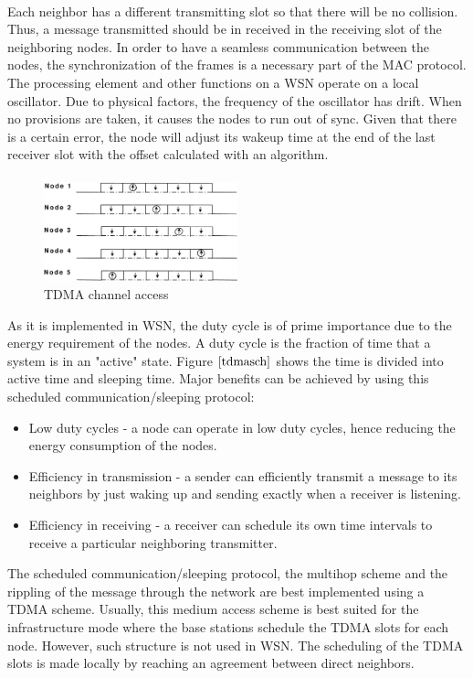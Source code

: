 \documentclass[a4paper,10pt]{report}
\begin{document}
\paragraph*{}
Each neighbor has a different transmitting slot so that there will be no collision. Thus, a message transmitted should be in received in the receiving slot of the neighboring nodes. In order to have a seamless communication between the nodes, the synchronization of the frames is a necessary part of the MAC protocol. The processing element and other functions on a WSN operate on a local oscillator. Due to physical factors, the frequency of the oscillator has drift. When no provisions are taken, it causes the nodes to run out of sync. Given that there is a certain error, the node will adjust its wakeup time at the end of the last receiver slot with the offset calculated with an algorithm. \paragraph*{}
\begin{figure}
\centering
\includegraphics[width=0.5\textwidth]{tdmaschedule}
\caption{TDMA channel access} \label{tdmasch}
\end{figure}
As it is implemented in WSN, the duty cycle is of prime importance due to the energy requirement of the nodes. A duty cycle is the fraction of time that a system is in an "active" state. Figure $\ref{tdmasch}$ shows the time is divided into active time and sleeping time. Major benefits can be achieved by using this scheduled communication/sleeping protocol:
\begin{itemize}
\item Low duty cycles - a node can operate in low duty cycles, hence reducing the energy consumption of the nodes.
\item Efficiency in transmission - a sender can efficiently transmit a message to its neighbors by just waking up and sending exactly when a receiver is listening.
\item Efficiency in receiving - a receiver can schedule its own time intervals to receive a particular neighboring transmitter.
\end{itemize}
The scheduled communication/sleeping protocol, the multihop scheme and the rippling of the message through the network are best implemented using a TDMA scheme. Usually, this medium access scheme is best suited for the infrastructure mode where the base stations schedule the TDMA slots for each node. However, such structure is not used in WSN. The scheduling of the TDMA slots is made locally by reaching an agreement between direct neighbors.
\end{document}
